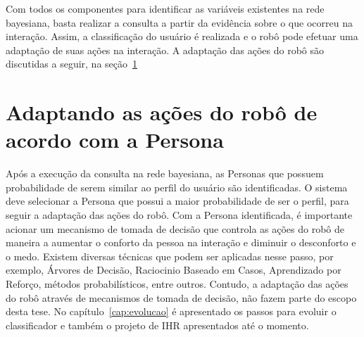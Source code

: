 Com todos os componentes para identificar as variáveis existentes na rede bayesiana, basta realizar a consulta a partir da evidência sobre o que ocorreu na interação. Assim, a classificação do usuário é realizada e o robô pode efetuar uma adaptação de suas ações na interação. A adaptação das ações do robô são discutidas a seguir, na seção~\ref{sec:classificapersona}

\section{Adaptando as ações do robô de acordo com a Persona}
\label{sec:classificapersona}
Após a execução da consulta na rede bayesiana, as Personas que possuem probabilidade de serem similar ao perfil do usuário são identificadas. O sistema deve selecionar a Persona que possui a maior probabilidade de ser o perfil, para seguir a adaptação das ações do robô. Com a Persona identificada, é importante acionar um mecanismo de tomada de decisão que controla as ações do robô de maneira a aumentar o conforto da pessoa na interação e diminuir o desconforto e o medo. Existem diversas técnicas que podem ser aplicadas nesse passo, por exemplo, Árvores de Decisão, Raciocinio Baseado em Casos, Aprendizado por Reforço, métodos probabilísticos, entre outros. Contudo, a adaptação das ações do robô através de mecanismos de tomada de decisão, não fazem parte do escopo desta tese. No capítulo~\ref{cap:evolucao} é apresentado os passos para evoluir o classificador e também o projeto de IHR apresentados até o momento.
